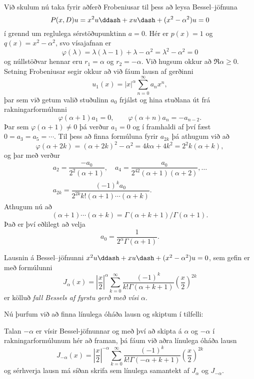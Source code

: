 \noindent
Við skulum nú taka fyrir aðferð Frobeniusar
til þess að leysa Bessel--jöfnuna
 \begin{equation*}P(x,D)u=x^2u\ddash+xu\dash+(x^2-\alpha^2)u=0
\label{3.5.1}
 \end{equation*}
í grennd um reglulega sérstöðupunktinn $a=0$.  
Hér er  $p(x)=1$ og $q(x)=x^2-\alpha^2$, svo vísajafnan er
 \begin{equation*}\varphi(\lambda)=\lambda(\lambda-1)+\lambda-\alpha^2=
\lambda^2-\alpha^2=0
\label{3.5.2}
 \end{equation*}
og núllstöðvar hennar eru $r_1=\alpha$ og $r_2=-\alpha$.  Við hugsum
okkur að $\Re \alpha\geq 0$.  Setning Frobeniusar segir okkur að við
fáum lausn af gerðinni 
$$ u_1(x)=|x|^\alpha\sum_{n=0}^\infty a_n x^n, $$
þar sem við getum valið stuðulinn $a_0$ frjálst og hina stuðlana út
frá rakningarformúlunni
$$ \varphi(\alpha+1)a_1=0, \qquad \varphi(\alpha+n)a_n=-a_{n-2}. $$
Þar sem $\varphi(\alpha+1)\neq 0$ þá verður $a_1=0$ og í framhaldi af
því fæst $0=a_3=a_5=\cdots$.  Til þess að finna formúluna fyrir
$a_{2k}$ þá athugum við að 
$$\varphi(\alpha+2k)=(\alpha+2k)^2-\alpha^2= 4k\alpha+4k^2=
2^2k(\alpha+k),
$$
og þar með verður 
\begin{gather*}
a_2=\dfrac{-a_0}{2^2(\alpha+1)}, \quad
a_4=\dfrac{a_0}{2^42(\alpha+1)(\alpha+2)}, \dots  \\
a_{2k}=\dfrac{(-1)^ka_0}{2^{2k}k!(\alpha+1)\cdots(\alpha+k)}.
\end{gather*}
Athugum nú að 
$$
(\alpha+1)\cdots(\alpha+k)={\Gamma}({\alpha}+k+1)/{\Gamma}({\alpha}+1).
$$
Það er því eðlilegt að velja
 $$a_0=\dfrac 1{2^\alpha\Gamma(\alpha+1)}.
 $$
\begin{sk}
Lausnin á Bessel--jöfnunni $x^2u\ddash+xu\dash+(x^2-\alpha^2)u=0$, sem
gefin er með formúlunni
 \begin{equation*}J_\alpha(x)=\left|\dfrac x2\right|^\alpha\sum_{k=0}^\infty
\dfrac{(-1)^k}{k!\Gamma(\alpha+k+1)}\left( \dfrac x2\right)^{2k}
\label{3.5.3}
 \end{equation*}
er kölluð {\it fall Bessels
af fyrstu gerð með vísi $\alpha$}.
\end{sk}

\smallskip
Nú þurfum við að finna línulega óháða lausn og skiptum í tilfelli:

\smallskip
{}  Talan $-{\alpha}$ er vísir
Bessel-jöfnunnar og með því að skipta á ${\alpha}$ og $-{\alpha}$ í
rakningarformúlunum hér að framan, þá fáum við aðra línulega óháða lausn
 \begin{equation*}
J_{-\alpha}(x)=\left|\dfrac x2\right|^{-\alpha}\sum_{k=0}^\infty
\dfrac{(-1)^k}{k!\Gamma(-\alpha+k+1)}\left( \dfrac x2\right)^{2k}
\label{3.5.4}
 \end{equation*}
og sérhverja lausn má síðan skrifa sem línulega samantekt af 
$J_{\alpha}$ og $J_{-\alpha}$.

